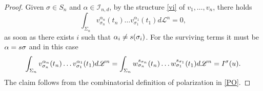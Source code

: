 \documentclass[12pt, reqno]{amsart}
\theoremstyle{plain}
\theoremstyle{definition}
\theoremstyle{remark}
\numberwithin{equation}{section}
\renewcommand{\L}{\mathcal{L}}
\newcommand{\I}{\mathcal{I}}
\newcommand{\s}{\sigma}
\newcommand{\0}{\theta}
\renewcommand{\a}{\alpha}
\newcommand{\1}{{-1}}
\renewcommand{\=}{\coloneqq}
\renewcommand{\.}{\dots}
\begin{document}
\begin{proof} Given $\s\in S_n$ and $\a \in \I_{n,d}$, by the structure \eqref{vi} of $v_1,\dots,v_n$, there holds
\[
 \int_{\Sigma_n}v^{\a_n}_{\s_n}(t_n)\.v^{\a_1}_{\s_1}(t_1)d\L^n=0,
\]
as soon as there exists $i$ such that $\a_i \neq \j (\s_i)$. For the surviving terms  it must be $\a = \j\s$ and in this case
\[
 \int_{\Sigma_n}v^{\a_n}_{\s_n}(t_n)\.v^{\a_1}_{\s_1}(t_1)d\L^n= 
 \int_{\Sigma_n}w^{\j_{\s_n}}_{\s_n}(t_n)\.w^{\j_{\s_1}}_{\s_1}(t_1)d\L^n= I^\s(u).
\]
The claim follows from the combinatorial definition of polarization in \eqref{PO}.



\end{proof}
\end{document}
